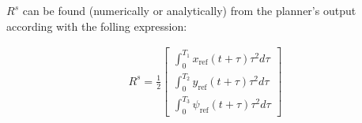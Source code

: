 \documentclass[letterpaper, 10 pt, conference]{ieeeconf}  %
\begin{document}
$R^s$ can be found (numerically or analytically) from the planner's output according with the folling expression:

\begin{eqnarray}
R^s =
\frac{1}{2}\left[\begin{array}{c}
\int_0^{T_1}x_{\text{ref}}(t+\tau)\tau^2d\tau\\
\int_0^{T_2}y_{\text{ref}}(t+\tau)\tau^2d\tau\\
\int_0^{T_3}\psi_{\text{ref}}(t+\tau)\tau^2d\tau
\end{array}\right]
\end{eqnarray}






\end{document}

